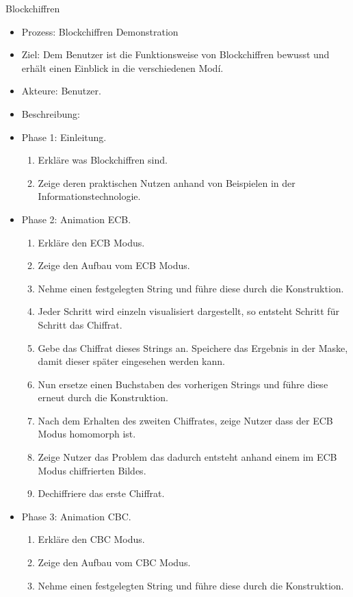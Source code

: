 \documentclass{article}
\begin{document}
\begin{FA}[start=700]
\item Blockchiffren
\end{FA}
\begin{itemize}[label={}]
\item Prozess: Blockchiffren Demonstration
\item Ziel: Dem Benutzer ist die Funktionsweise von Blockchiffren bewusst und erhält einen Einblick in die verschiedenen Modí.
\item Akteure: Benutzer.
\item Beschreibung:
\item Phase 1: Einleitung.
\begin{enumerate}
\item Erkläre was Blockchiffren sind.
\item Zeige deren praktischen Nutzen anhand von Beispielen in der Informationstechnologie.
\end{enumerate}
\item Phase 2: Animation ECB.
\begin{enumerate}
\item Erkläre den ECB Modus.
\item Zeige den Aufbau vom ECB Modus.
\item Nehme einen festgelegten String und führe diese durch die Konstruktion.
\item Jeder Schritt wird einzeln visualisiert dargestellt, so entsteht Schritt für Schritt das Chiffrat.
\item Gebe das Chiffrat dieses Strings an. Speichere das Ergebnis in der Maske, damit dieser später eingesehen werden kann.
\item Nun ersetze einen Buchstaben des vorherigen Strings und führe diese erneut durch die Konstruktion.
\item Nach dem Erhalten des zweiten Chiffrates, zeige Nutzer dass der ECB Modus homomorph ist.
\item Zeige Nutzer das Problem das dadurch entsteht anhand einem im ECB Modus chiffrierten Bildes.
\item Dechiffriere das erste Chiffrat.
\end{enumerate}
\item Phase 3: Animation CBC.
\begin{enumerate}
\item Erkläre den CBC Modus.
\item Zeige den Aufbau vom CBC Modus.
\item Nehme einen festgelegten String und führe diese durch die Konstruktion.

\end{enumerate}
\end{itemize}
\end{document}
